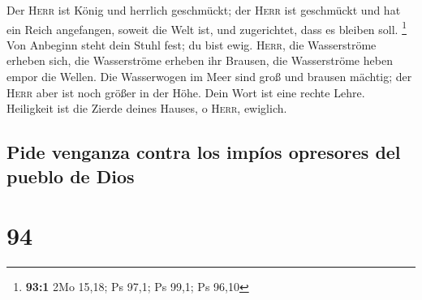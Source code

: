  Der \textsc{Herr} ist König und herrlich geschmückt; der
\textsc{Herr} ist geschmückt und hat ein Reich angefangen, soweit die
Welt ist, und zugerichtet, dass es bleiben soll. \footnote{\textbf{93:1}
  2Mo 15,18; Ps 97,1; Ps 99,1; Ps 96,10}  Von Anbeginn
steht dein Stuhl fest; du bist ewig.  \textsc{Herr}, die
Wasserströme erheben sich, die Wasserströme erheben ihr Brausen, die
Wasserströme heben empor die Wellen.  Die Wasserwogen im
Meer sind groß und brausen mächtig; der \textsc{Herr} aber ist noch
größer in der Höhe.  Dein Wort ist eine rechte Lehre.
Heiligkeit ist die Zierde deines Hauses, o \textsc{Herr}, ewiglich.

\hypertarget{pide-venganza-contra-los-impuxedos-opresores-del-pueblo-de-dios}{%
\subsection{Pide venganza contra los impíos opresores del pueblo de
Dios}\label{pide-venganza-contra-los-impuxedos-opresores-del-pueblo-de-dios}}

\hypertarget{section-93}{%
\section{94}\label{section-93}}

